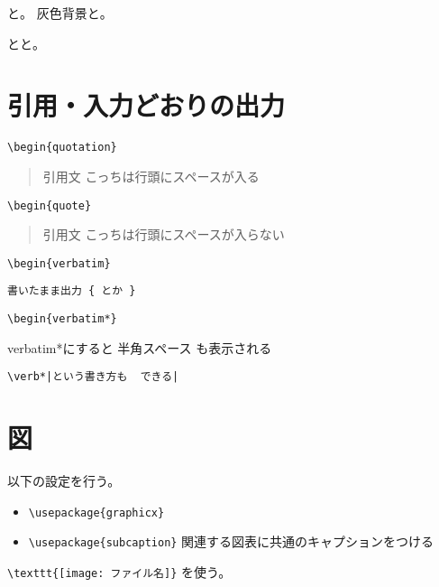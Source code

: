 \documentclass[draft]{jlreq} %
\begin{document}
と。
\colorbox[gray]{0.8}{灰色背景}と。

とと。



\section{引用・入力どおりの出力}

\verb|\begin{quotation}|
\begin{quotation}
 引用文 こっちは行頭にスペースが入る
\end{quotation}

\verb|\begin{quote}|
\begin{quote}
 引用文 こっちは行頭にスペースが入らない
\end{quote}

\verb|\begin{verbatim}|
\begin{verbatim}
書いたまま出力 { とか }
\end{verbatim}

\verb|\begin{verbatim*}|
\begin{verbatim*}
verbatim*にすると 半角スペース も表示される
\end{verbatim*}

\verb*/\verb*|という書き方も  できる|/

\section{図}

以下の設定を行う。
\begin{itemize}
 \item \verb|\usepackage{graphicx}|
 \item \verb|\usepackage{subcaption}| 関連する図表に共通のキャプションをつける
\end{itemize}

\verb|\texttt{[image: ファイル名]}| を使う。
\end{document}
